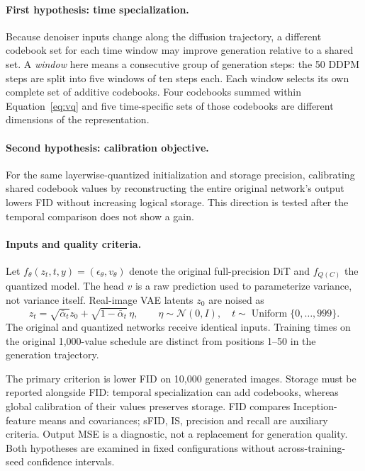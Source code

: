 \documentclass{article}
\begin{document}
\paragraph{First hypothesis: time specialization.}
Because denoiser inputs change along the diffusion trajectory, a different codebook set for each time window may improve generation relative to a shared set. A \emph{window} here means a consecutive group of generation steps: the 50 DDPM steps are split into five windows of ten steps each. Each window selects its own complete set of additive codebooks. Four codebooks summed within Equation~\eqref{eq:vq} and five time-specific sets of those codebooks are different dimensions of the representation.

\paragraph{Second hypothesis: calibration objective.}
For the same layerwise-quantized initialization and storage precision, calibrating shared codebook values by reconstructing the entire original network's output lowers FID without increasing logical storage. This direction is tested after the temporal comparison does not show a gain.

\paragraph{Inputs and quality criteria.}
Let $f_\theta(z_t,t,y)=(\epsilon_\theta,v_\theta)$ denote the original full-precision DiT and $f_{Q(C)}$ the quantized model. The head $v$ is a raw prediction used to parameterize variance, not variance itself. Real-image VAE latents $z_0$ are noised as
\begin{equation}
 z_t=\sqrt{\bar\alpha_t}z_0+\sqrt{1-\bar\alpha_t}\,\eta,
 \qquad \eta\sim\mathcal N(0,I),\quad t\sim\operatorname{Uniform}\{0,\ldots,999\}.
 \label{eq:noising}
\end{equation}
The original and quantized networks receive identical inputs. Training times on the original 1,000-value schedule are distinct from positions 1--50 in the generation trajectory.

The primary criterion is lower FID on 10,000 generated images. Storage must be reported alongside FID: temporal specialization can add codebooks, whereas global calibration of their values preserves storage. FID compares Inception-feature means and covariances; sFID, IS, precision and recall are auxiliary criteria. Output MSE is a diagnostic, not a replacement for generation quality. Both hypotheses are examined in fixed configurations without across-training-seed confidence intervals.
\end{document}
